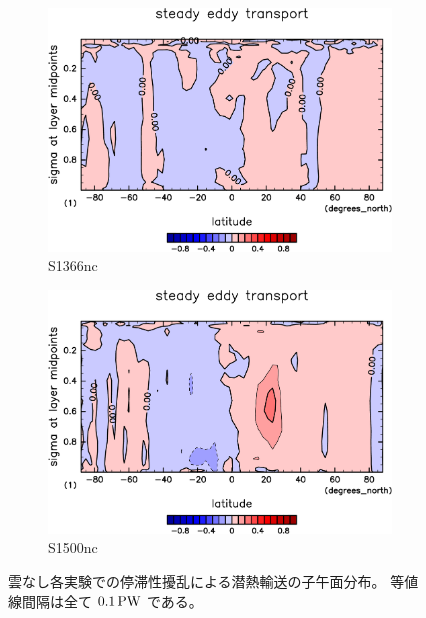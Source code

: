 \documentclass[body]{subfiles}
\begin{document}
\begin{figure}[t]
	\centering
	\begin{subfigure}{.4\textwidth}
		\centering
		\includegraphics[width=\columnwidth]{S1366-nc/MeriHeatTransTest@latentEn_SE,time=3650:4015-crop-rotate.pdf}
		\caption{S1366nc}\label{潜熱停滞性擾乱S1366nc}
	\end{subfigure}
	\begin{subfigure}{.4\textwidth}
		\centering
		\includegraphics[width=\columnwidth]{S1500-nc/MeriHeatTransTest@latentEn_SE,time=3650:4015-crop-rotate.pdf}
		\caption{S1500nc}\label{潜熱停滞性擾乱S1500nc}
	\end{subfigure}
	\caption[雲なし各実験でのに停滞性擾乱による潜熱輸送の子午面分布]{
		雲なし各実験での停滞性擾乱による潜熱輸送の子午面分布。
		等値線間隔は全て \(0.1\hmu{PW}\) である。
	}\label{潜熱停滞性擾乱nc}
\end{figure}
\end{document}
